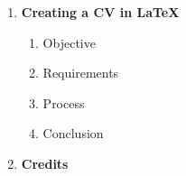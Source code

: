 \begin{enumerate}
    \item \textbf{Creating a CV in LaTeX}
    \begin{enumerate}
        \renewcommand{\labelenumii}{\arabic{enumi}.\arabic{enumii}}
        \item Objective
        \item Requirements
        \item Process
        \item Conclusion
    \end{enumerate}

    \item \textbf{Credits}
\end{enumerate}